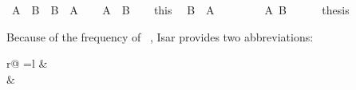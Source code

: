 \begin{isabellebody}
\ {\isachardoublequote}A\ {\isasymand}\ B\ {\isasymlongrightarrow}\ B\ {\isasymand}\ A{\isachardoublequote}\isanewline
%
\isadelimproof
%
\endisadelimproof
%
\isatagproof
\isamarkupfalse%
\isanewline
\ \ \isamarkupfalse%
\ {\isachardoublequote}A\ {\isasymand}\ B{\isachardoublequote}\isanewline
\ \ \isamarkupfalse%
\ this\ \isamarkupfalse%
\ {\isachardoublequote}B\ {\isasymand}\ A{\isachardoublequote}\isanewline
\ \ \isamarkupfalse%
\isanewline
\ \ \ \ \isamarkupfalse%
\ {\isachardoublequote}A{\isachardoublequote}\ {\isachardoublequote}B{\isachardoublequote}\isanewline
\ \ \ \ \isamarkupfalse%
\ {\isacharquery}thesis\ \isamarkupfalse%
\isacommand{{\isachardot}{\isachardot}}\isanewline
\ \ \isamarkupfalse%
\isanewline
\isamarkupfalse%
%
\endisatagproof
{\isafoldproof}%
%
\isadelimproof
%
\endisadelimproof
\isamarkuptrue%
%
\begin{isamarkuptext}%
\noindent Because of the frequency of ~, Isar provides two abbreviations:
\begin{center}
\begin{tabular}{r@ {\quad=\quad}l}
 &   \\
 &  
\end{tabular}
\end{center}


\end{isamarkuptext}
\end{isabellebody}
